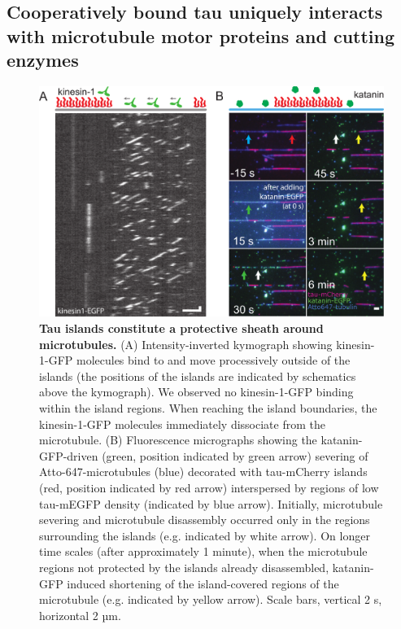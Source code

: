\subsection{Cooperatively bound tau uniquely interacts with microtubule motor proteins and cutting enzymes}
\begin{figure}[h!]
\centering
\includegraphics[width=1\linewidth]{Figures/tau3.png}
\caption[Tau islands constitute a protective sheath around microtubules.]{
\textbf{Tau islands constitute a protective sheath around microtubules.} (A) Intensity-inverted kymograph showing kinesin-1-GFP molecules bind to and move processively outside of the islands (the positions of the islands are indicated by schematics above the kymograph). We observed no kinesin-1-GFP binding within the island regions. When reaching the island boundaries, the kinesin-1-GFP molecules immediately dissociate from the microtubule. (B) Fluorescence micrographs showing the katanin-GFP-driven (green, position indicated by green arrow) severing of Atto-647-microtubules (blue) decorated with tau-mCherry islands (red, position indicated by red arrow) interspersed by regions of low tau-mEGFP density (indicated by blue arrow). Initially, microtubule severing and microtubule disassembly occurred only in the regions surrounding the islands (e.g. indicated by white arrow). On longer time scales (after approximately 1 minute), when the microtubule regions not protected by the islands already disassembled, katanin-GFP induced shortening of the island-covered regions of the microtubule (e.g. indicated by yellow arrow). Scale bars, vertical 2 s, horizontal 2 µm.   
	}\label{tau3}
\end{figure}
